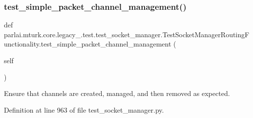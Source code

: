 \subsubsection{\texorpdfstring{test\+\_\+simple\+\_\+packet\+\_\+channel\+\_\+management()}{test\_simple\_packet\_channel\_management()}}
{\footnotesize\ttfamily def parlai.\+mturk.\+core.\+legacy\+\_.\+test.\+test\+\_\+socket\+\_\+manager.\+Test\+Socket\+Manager\+Routing\+Functionality.\+test\+\_\+simple\+\_\+packet\+\_\+channel\+\_\+management (\begin{DoxyParamCaption}\item[{}]{self }\end{DoxyParamCaption})}

\begin{DoxyVerb}Ensure that channels are created, managed, and then removed as expected.
\end{DoxyVerb}
 

Definition at line 963 of file test\+\_\+socket\+\_\+manager.\+py.


